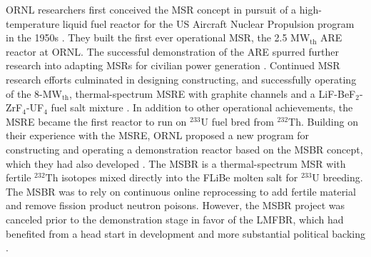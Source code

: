 \gls{ORNL} researchers first conceived the \gls{MSR} concept in pursuit of a high-temperature
liquid fuel reactor for the US Aircraft Nuclear Propulsion program in
the 1950s \cite{rosenthal_molten-salt_1970}. They
built the first ever operational \gls{MSR}, the 2.5 MW$_{\text{th}}$
\gls{ARE} reactor at \gls{ORNL}. The successful demonstration of the \gls{ARE} spurred further
research into adapting \glspl{MSR} for civilian power generation \cite{rosenthal_molten-salt_1970}.
Continued \gls{MSR} research efforts culminated in designing constructing, and successfully
operating of the 8-MW$_{\text{th}}$, thermal-spectrum \gls{MSRE} with
graphite channels and a LiF-BeF$_2$-ZrF$_4$-UF$_4$ fuel salt mixture
\cite{haubenreich_experience_1970}. In addition to other operational achievements, the
\gls{MSRE} became the first reactor to run on $^{233}$U fuel bred from $^{232}$Th. Building on
their experience with the \gls{MSRE}, \gls{ORNL} proposed a new program for constructing and
operating a demonstration reactor based on the \gls{MSBR} concept, which they had also developed
\cite{macpherson_molten_1985}. The \gls{MSBR} is a thermal-spectrum \gls{MSR} with fertile
$^{232}$Th isotopes mixed directly into the \gls{FLiBe} molten salt for $^{233}$U breeding. The
\gls{MSBR} was to rely on continuous online reprocessing to add fertile
material and remove fission product neutron poisons.
However, the \gls{MSBR} project was canceled prior to the demonstration stage in
favor of the \gls{LMFBR}, which had benefited from a head start in development and more substantial
political backing \cite{macpherson_molten_1985}.

